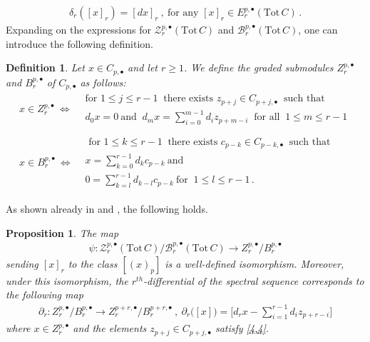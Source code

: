 \documentclass[10pt]{amsart}
\newcounter{dummy} \numberwithin{dummy}{section}
\newtheorem{definition}[dummy]{Definition}
\newtheorem{proposition}[dummy]{Proposition}
\theoremstyle{remark}
\numberwithin{equation}{section}
\begin{document}
\begin{align*}
    \delta_r([x]_r)=[dx]_r\ ,\ \text{
     for any 
    }[x]_r\in E^{p,\bullet}_r(\mathrm{Tot}\,C)\,.
\end{align*}
Expanding on the expressions for $\mathcal{Z}_r^{p,\bullet}(\mathrm{Tot}\,C)$ and $\mathcal{B}_r^{p,\bullet}(\mathrm{Tot}\,C)$, one can introduce the following definition.
\begin{definition}Let $x\in C_{p,\bullet}$ and let $r\ge 1$. We define the graded submodules $Z_r^{p,\bullet}$ and $B^{p,\bullet}_r$ of $C_{p,\bullet}$ as follows:
\begin{align}
    x\in Z_r^{p,\bullet}\ \Longleftrightarrow & \begin{array}{c} \text{
     for 
    }1\le j\le r-1\ \text{ there exists } z_{p+j}\in C_{p+j,\bullet}\ \text{ such that } \\ d_0x=0\ \text{
     and 
    }\ d_mx=\sum_{i=0}^{m-1}d_iz_{p+m-i}\ \text{ for all }\ 1\le m\le r-1
    \end{array}
    \label{4,4}
    \\ \nonumber \\
    x\in B_r^{p,\bullet}\ \Longleftrightarrow & \begin{array}{c} \text{ for }1\le k\le r-1 \ \text{ there exists }c_{p-k}\in C_{p-k,\bullet} \ \text{ such that} \\ 
        x=\sum_{k=0}^{r-1}d_kc_{p-k}\ \text{
         and 
        }\\0=\sum_{k=l}^{r-1}d_{k-l}c_{p-k}\ \text{
         for 
        }\ 1\le l\le r-1\,.
    \end{array}
\end{align}
    
\end{definition}
As shown already in \cite{livernet2020spectral} and \cite{lerario2023multicomplexes}, the following holds.
\begin{proposition}
    The map
    \begin{align*}
        \psi\colon\mathcal{Z}_r^{p,\bullet}(\mathrm{Tot\,}C)/\mathcal{B}_r^{p,\bullet}(\mathrm{Tot}\,C)\longrightarrow Z_r^{p,\bullet}/B_r^{p,\bullet}
    \end{align*}
    sending $[x]_r$ to the class $[(x)_p]$ is a well-defined isomorphism. Moreover, under this isomorphism, the $r^{th}$-differential of the spectral sequence corresponds to the following map
    \begin{align*}
        \partial_r\colon Z_r^{p,\bullet}/B_r^{p,\bullet}\to Z_r^{p+r,\bullet}/B_r^{p+r,\bullet}\ ,\ \partial_r\big([x]\big)=\bigg[d_rx-\sum_{i=1}^{r-1}d_iz_{p+r-i}\bigg]
    \end{align*}
    where $x\in Z_r^{p,\bullet}$ and the elements $z_{p+j}\in C_{p+j,\bullet}$ satisfy \eqref{4,4}.
\end{proposition}
\end{document}
